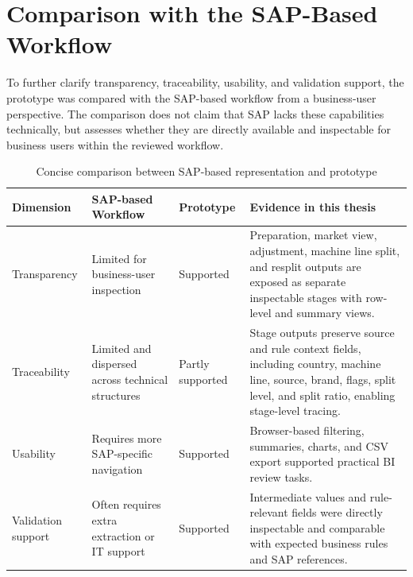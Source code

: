 



\section{Comparison with the SAP-Based Workflow}

To further clarify transparency, traceability, usability, and validation support, the prototype was compared with the SAP-based workflow from a business-user perspective. The comparison does not claim that SAP lacks these capabilities technically, but assesses whether they are directly available and inspectable for business users within the reviewed workflow.

\begin{table}[htbp]
    \centering
    \caption{Concise comparison between SAP-based representation and prototype}
    \label{tab:sap_prototype_comparison}
    \setlength{\tabcolsep}{4pt}
    \small
    \begin{tabularx}{\textwidth}{|>{\raggedright\arraybackslash}p{2.1cm}|>{\raggedright\arraybackslash}p{1.8cm}|>{\raggedright\arraybackslash}p{1.8cm}|X|}
        \hline
        \textbf{Dimension} & \textbf{SAP-based Workflow} & \textbf{Prototype} & \textbf{Evidence in this thesis} \\
        \hline
        Transparency & Limited for business-user inspection & Supported & Preparation, market view, adjustment, machine line split, and resplit outputs are exposed as separate inspectable stages with row-level and summary views. \\
        \hline
        Traceability & Limited and dispersed across technical structures & Partly supported & Stage outputs preserve source and rule context fields, including country, machine line, source, brand, flags, split level, and split ratio, enabling stage-level tracing. \\
        \hline
        Usability & Requires more SAP-specific navigation & Supported & Browser-based filtering, summaries, charts, and CSV export supported practical BI review tasks. \\
        \hline
        Validation support & Often requires extra extraction or IT support & Supported & Intermediate values and rule-relevant fields were directly inspectable and comparable with expected business rules and SAP references. \\
        \hline
    \end{tabularx}
\end{table}

